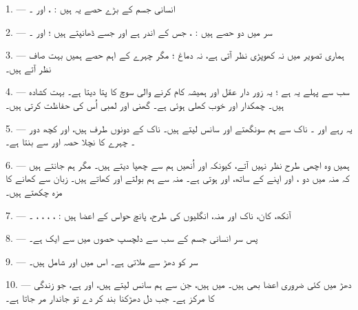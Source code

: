 \VUsaut{4.0mm}
\VUsaut{2.0mm}

\VUsaut{2.4mm}
\VUsaut{3.0mm}

\VUsaut{3.0mm}

1. --- انسانی جسم کے بڑے حصے یہ ہیں : ،  اور
۔

2. --- سر میں دو حصے ہیں : ، جس کے اندر 
ہے اور جسے  ڈھانپتے ہیں ؛ اور ۔

3. --- ہماری تصویر میں نہ کھوپڑی نظر آتی ہے، نہ دماغ ؛ مگر چہرے کے
اہم حصے ہمیں بہت صاف نظر آتے ہیں۔

4. --- سب سے پہلے یہ  ہے ؛ یہ زور دار عقل اور ہمیشہ
کام کرنے والی سوچ کا پتا دیتا ہے۔  بہت کشادہ ہیں۔
 چمکدار اور خوب کھلی ہوئی ہے۔ گھنی  اور
لمبی  اُس کی حفاظت کرتی ہیں۔

5. --- یہ رہے  اور ۔ ناک سے ہم سونگھتے اور
سانس لیتے ہیں۔ ناک کے دونوں طرف  ہیں، اور کچھ دور
۔ چہرے کا نچلا حصہ  اور  سے
بنتا ہے۔

6. --- ہمیں وہ اچھی طرح نظر نہیں آتے، کیونکہ  اور
 اُنھیں ہم سے چھپا دیتے ہیں۔ مگر ہم جانتے ہیں کہ منہ
میں دو ،  اور 
اپنے  کے ساتھ، اور  ہوتی ہے۔ منہ سے ہم
بولتے اور کھاتے ہیں۔ زبان سے کھانے کا مزہ چکھتے ہیں۔

7. --- آنکھ، کان، ناک اور منہ، انگلیوں کی طرح، پانچ حواس کے اعضا
ہیں : ، ، ، ،
۔

8. --- پس سر انسانی جسم کے سب سے دلچسپ حصوں میں سے ایک ہے۔

\VUsaut{4.4mm}
\VUsaut{3.0mm}

9. ---  سر کو دھڑ سے ملاتی ہے۔ اس میں  اور
 شامل ہیں۔

10. --- دھڑ میں کئی ضروری اعضا بھی ہیں۔  میں
 ہیں، جن سے ہم سانس لیتے ہیں، اور  ہے، جو
زندگی کا مرکز ہے۔ جب دل دھڑکنا بند کر دے تو جاندار مر جاتا ہے۔

